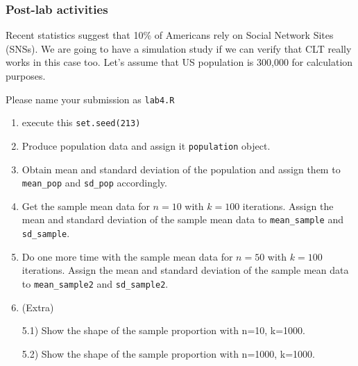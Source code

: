 \documentclass[
]{article}
\begin{document}
\subsubsection{Post-lab activities}\label{post-lab-activities}

Recent statistics suggest that 10\% of Americans rely on Social Network
Sites (SNSs). We are going to have a simulation study if we can verify
that CLT really works in this case too. Let's assume that US population
is 300,000 for calculation purposes.

Please name your submission as \texttt{lab4.R}

\begin{enumerate}
\def\labelenumi{\arabic{enumi}.}
\setcounter{enumi}{-1}
\item
  execute this \texttt{set.seed(213)}
\item
  Produce population data and assign it \texttt{population} object.
\item
  Obtain mean and standard deviation of the population and assign them
  to \texttt{mean\_pop} and \texttt{sd\_pop} accordingly.
\item
  Get the sample mean data for \(n=10\) with \(k=100\) iterations.
  Assign the mean and standard deviation of the sample mean data to
  \texttt{mean\_sample} and \texttt{sd\_sample}.
\item
  Do one more time with the sample mean data for \(n=50\) with \(k=100\)
  iterations. Assign the mean and standard deviation of the sample mean
  data to \texttt{mean\_sample2} and \texttt{sd\_sample2}.
\item
  (Extra)

  5.1) Show the shape of the sample proportion with n=10, k=1000.

  5.2) Show the shape of the sample proportion with n=1000, k=1000.
\end{enumerate}
\end{document}
